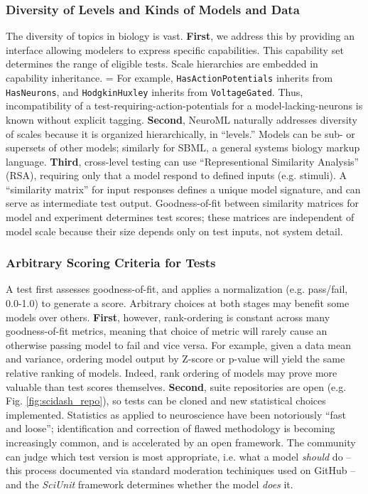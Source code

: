\documentclass[11pt,letterpaper]{article}
\let\verbx\lstinline
\begin{document}
\subsubsection{Diversity of Levels and Kinds of Models and Data}
The diversity of topics in biology is vast. 
\textbf{First}, we address this by providing an interface allowing modelers to express specific capabilities.  
This capability set determines the range of eligible tests.  Scale hierarchies are embedded in capability inheritance.  =
For example, \verbx{HasActionPotentials} inherits from \verbx{HasNeurons}, and \verbx{HodgkinHuxley} inherits from \verbx{VoltageGated}. 
Thus, incompatibility of a test-requiring-action-potentials for a model-lacking-neurons is known without explicit tagging. 
\textbf{Second}, NeuroML naturally addresses diversity of scales because it is organized hierarchically, in ``levels.''  
Models can be sub- or supersets of other models; similarly for SBML\cite{sbml_url,hucka_systems_2003}, a general systems biology markup language. 
\textbf{Third}, cross-level testing can use ``Representional Similarity Analysis'' (RSA)\cite{kriegeskorte_representational_2008}, requiring only that a model respond to defined inputs (e.g. stimuli). 
A ``similarity matrix'' for input responses defines a unique model signature, and can serve as intermediate test output. 
Goodness-of-fit between similarity matrices for model and experiment determines test scores; 
these matrices are independent of model scale because their size depends only on test inputs, not system detail.  

\subsubsection{Arbitrary Scoring Criteria for Tests}
A test first assesses goodness-of-fit, and applies a normalization (e.g. pass/fail, 0.0-1.0) to generate a score. 
Arbitrary choices at both stages may benefit some models over others.  \textbf{First}, however, rank-ordering is constant across many goodness-of-fit metrics, meaning that choice of metric will rarely cause an otherwise passing model to fail and vice versa. 
For example, given a data mean and variance, ordering model output by Z-score or p-value will yield the same relative ranking of models. 
Indeed, rank ordering of models may prove more valuable than test scores themselves. 
\textbf{Second}, suite repositories are open (e.g. Fig. \ref{fig:scidash_repo}), so tests can be cloned and new statistical choices implemented. 
Statistics as applied to neuroscience have been notoriously ``fast and loose''; 
identification and correction of flawed methodology is becoming increasingly common\cite{button_power_2013,kriegeskorte_circular_2009,galbraith_study_2010,fish_fmri_url}, and is accelerated by an open framework. 
The community can judge which test version is most appropriate, i.e. what a model \textit{should} do -- this process documented via standard moderation techiniques used on GitHub -- and the \textit{SciUnit} framework determines whether the model \textit{does} it.  
\end{document}
